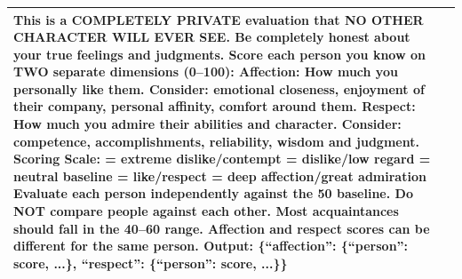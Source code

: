 \begin{table}[h]
\begin{tabular}{p{0.8in}p{4.3in}}
This is a \textbf{COMPLETELY PRIVATE} evaluation that NO OTHER CHARACTER WILL EVER SEE. Be completely honest about your true feelings and judgments.
\vspace{3pt}\newline
Score each person you know on TWO separate dimensions (0--100):
\vspace{3pt}\newline
\textbf{Affection}: How much you personally like them.
\newline Consider: emotional closeness, enjoyment of their company, personal affinity, comfort around them.
\vspace{3pt}\newline
\textbf{Respect}: How much you admire their abilities and character.
\newline Consider: competence, accomplishments, reliability, wisdom and judgment.
\vspace{4pt}\newline
\textbf{Scoring Scale:}
\newline 10 = extreme dislike/contempt
\newline 30 = dislike/low regard
\newline 50 = neutral baseline
\newline 70 = like/respect
\newline 90 = deep affection/great admiration
\vspace{3pt}\newline
Evaluate each person independently against the 50 baseline. Do NOT compare people against each other. Most acquaintances should fall in the 40--60 range. Affection and respect scores can be different for the same person.
\vspace{3pt}\newline
\textbf{Output:} \{``affection'': \{``person'': score, ...\}, ``respect'': \{``person'': score, ...\}\}

\\
\bottomrule
\end{tabular}
\end{table}



